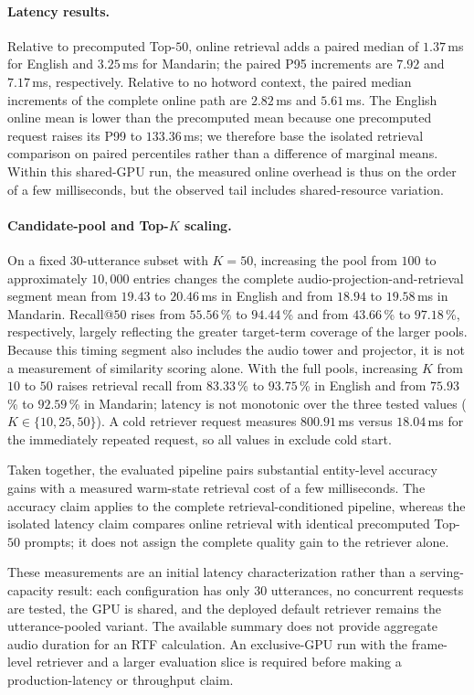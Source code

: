 \paragraph{Latency results.}
Relative to precomputed Top-$50$, online retrieval adds a paired
median of $1.37$\,ms for English and $3.25$\,ms for Mandarin; the
paired P95 increments are $7.92$ and $7.17$\,ms, respectively.
Relative to no hotword context, the paired median increments of the
complete online path are $2.82$\,ms and $5.61$\,ms. The English online
mean is lower than the precomputed mean because one precomputed
request raises its P99 to $133.36$\,ms; we therefore base the isolated
retrieval comparison on paired percentiles rather than a difference
of marginal means. Within this shared-GPU run, the measured online
overhead is thus on the order of a few milliseconds, but the observed
tail includes shared-resource variation.

\paragraph{Candidate-pool and Top-$K$ scaling.}
On a fixed $30$-utterance subset with $K{=}50$, increasing the pool
from $100$ to approximately $10{,}000$ entries changes the complete
audio-projection-and-retrieval segment mean from $19.43$ to
$20.46$\,ms in English and from $18.94$ to $19.58$\,ms in Mandarin.
Recall@$50$ rises from $55.56$\,\% to $94.44$\,\% and from
$43.66$\,\% to $97.18$\,\%, respectively, largely reflecting the
greater target-term coverage of the larger pools. Because this timing
segment also includes the audio tower and projector, it is not a
measurement of similarity scoring alone. With the full pools,
increasing $K$ from $10$ to $50$ raises retrieval recall from
$83.33$\,\% to $93.75$\,\% in English and from $75.93$\,\% to
$92.59$\,\% in Mandarin; latency is not monotonic over the three
tested values ($K\in\{10,25,50\}$). A cold retriever request measures
$800.91$\,ms versus $18.04$\,ms for the immediately repeated request,
so all values in  exclude cold start.

Taken together, the evaluated pipeline pairs substantial entity-level
accuracy gains with a measured warm-state retrieval cost of a few
milliseconds. The accuracy claim applies to the complete
retrieval-conditioned pipeline, whereas the isolated latency claim
compares online retrieval with identical precomputed Top-$50$ prompts;
it does not assign the complete quality gain to the retriever alone.

These measurements are an initial latency characterization rather
than a serving-capacity result: each configuration has only $30$
utterances, no concurrent requests are tested, the GPU is shared, and
the deployed default retriever remains the utterance-pooled variant.
The available summary does not provide aggregate audio duration for
an RTF calculation. An exclusive-GPU run with the frame-level
retriever and a larger evaluation slice is required before making a
production-latency or throughput claim.

\FloatBarrier

